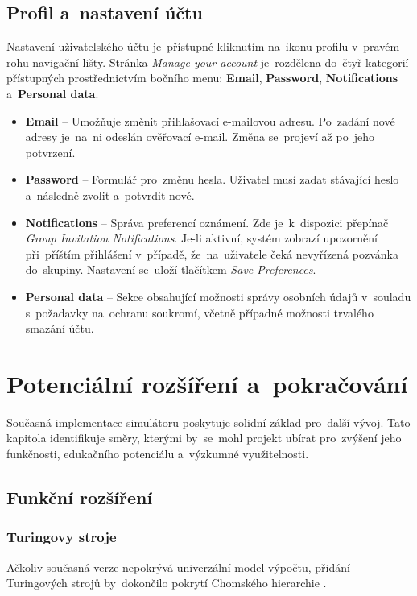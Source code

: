 \documentclass[
  master,
  program=ainfvs,
  printversion,
  figures=false,
  tables=false,
  glossaries,
  index
]{kidiplom}
\begin{document}
\subsection{Profil a~nastavení účtu}

Nastavení uživatelského účtu je~přístupné kliknutím na~ikonu profilu v~pravém rohu navigační lišty. Stránka \emph{Manage your account} je~rozdělena do~čtyř kategorií přístupných prostřednictvím bočního menu: \textbf{Email}, \textbf{Password}, \textbf{Notifications} a~\textbf{Personal data}.

\begin{itemize}
    \item \textbf{Email} -- Umožňuje změnit přihlašovací e-mailovou adresu. Po~zadání nové adresy je~na~ni odeslán ověřovací e-mail. Změna se~projeví až po~jeho potvrzení.
    \item \textbf{Password} -- Formulář pro~změnu hesla. Uživatel musí zadat stávající heslo a~následně zvolit a~potvrdit nové.
    \item \textbf{Notifications} -- Správa preferencí oznámení. Zde je~k~dispozici přepínač \emph{Group Invitation Notifications}. Je-li aktivní, systém zobrazí upozornění při~příštím přihlášení v~případě, že~na~uživatele čeká nevyřízená pozvánka do~skupiny. Nastavení se~uloží tlačítkem \emph{Save Preferences}.
    \item \textbf{Personal data} -- Sekce obsahující možnosti správy osobních údajů v~souladu s~požadavky na~ochranu soukromí, včetně případné možnosti trvalého smazání účtu.
\end{itemize}


\newpage
\section{Potenciální rozšíření a~pokračování}
Současná implementace simulátoru poskytuje solidní základ pro~další vývoj. Tato kapitola identifikuje směry, kterými by~se~mohl projekt ubírat pro~zvýšení jeho funkčnosti, edukačního potenciálu a~výzkumné využitelnosti.

\subsection{Funkční rozšíření}

\subsubsection{Turingovy stroje}
Ačkoliv současná verze nepokrývá univerzální model výpočtu, přidání Turingových strojů by~dokončilo pokrytí Chomského hierarchie \cite{jancar_ti,hopcroft_ullman}. 
\end{document}
